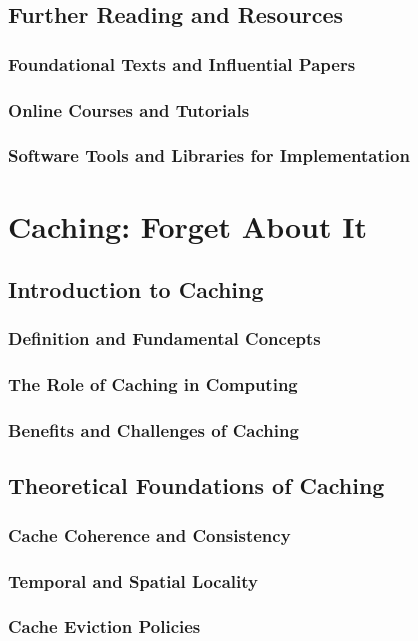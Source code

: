 \documentclass[12pt]{book} %
\begin{document}
\section{Further Reading and Resources}
\subsection{Foundational Texts and Influential Papers}
\subsection{Online Courses and Tutorials}
\subsection{Software Tools and Libraries for Implementation}


\chapter{Caching: Forget About It}

\section{Introduction to Caching}
\subsection{Definition and Fundamental Concepts}
\subsection{The Role of Caching in Computing}
\subsection{Benefits and Challenges of Caching}

\section{Theoretical Foundations of Caching}
\subsection{Cache Coherence and Consistency}
\subsection{Temporal and Spatial Locality}
\subsection{Cache Eviction Policies}
\end{document}
